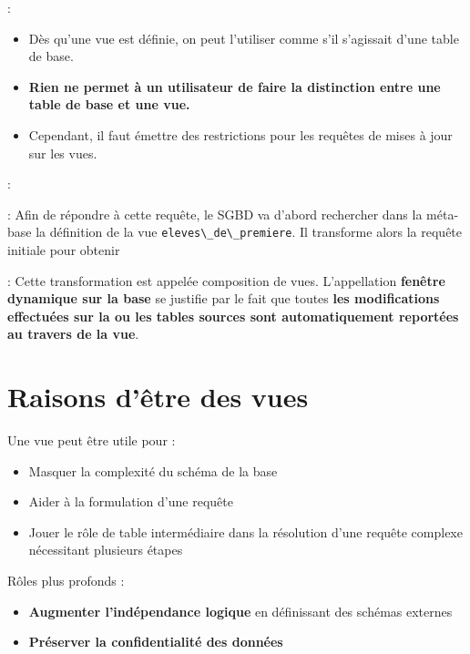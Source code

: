 \documentclass[10pt]{beamer}
\begin{document}
\begin{frame}{\secname : \subsecname}
    \begin{itemize}
        \item Dès qu'une vue est définie, on peut l'utiliser comme s'il s'agissait d'une table de base.
        \item \textbf{Rien ne permet à un utilisateur de faire la distinction entre une table de base et une vue.}
        \item Cependant, il faut émettre des restrictions pour les requêtes de mises à jour sur les vues.
    \end{itemize}
\end{frame}
\begin{frame}{\secname : \subsecname}
    
\end{frame}

\begin{frame}{\secname : \subsecname}
    Afin de répondre à cette requête, le SGBD va d'abord rechercher dans la méta-base la définition de la vue \lstinline[language=plsql]!eleves\_de\_premiere!.  Il transforme alors la requête initiale pour obtenir
    
\end{frame}

\begin{frame}{\secname : \subsecname}
    Cette transformation est appelée composition de vues.
    L'appellation \textbf{fenêtre dynamique sur la base} se justifie par le fait que toutes \textbf{les modifications effectuées sur la ou les tables sources sont automatiquement reportées au travers de la vue}.
\end{frame}

\section{Raisons d'être des vues}
\begin{frame}{\secname}
    Une vue peut être utile pour :
    \begin{itemize}
        \item Masquer la complexité du schéma de la base
        \item Aider à la formulation d'une requête
        \item Jouer le rôle de table intermédiaire dans la résolution d'une requête complexe nécessitant plusieurs étapes
    \end{itemize}
    Rôles plus profonds :
    \begin{itemize}
        \item \textbf{Augmenter l'indépendance logique} en définissant des schémas externes
        \item \textbf{Préserver la confidentialité des données}
    \end{itemize}
\end{frame}
\end{document}
